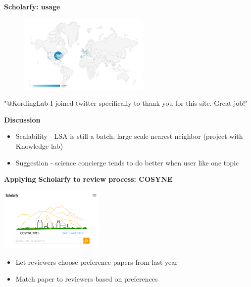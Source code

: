 \begin{frame}{\textbf{Scholarfy: usage}}

\begin{figure}
\includegraphics[width=2.5in]{images/scholarfy_map}\\
\end{figure}

\begin{center}
"@KordingLab I joined twitter specifically to thank you for this site. Great job!"
\end{center}

\end{frame}


\begin{frame}{\textbf{Discussion}}

\begin{itemize}
\item Scalability - LSA is still a batch, large scale nearest neighbor (project with Knowledge lab)
\item Suggestion - science concierge tends to do better when user like one topic
\end{itemize}

\end{frame}


\begin{frame}{\textbf{Applying Scholarfy to review process: COSYNE}}

\begin{center}
\href{http://cosyne.scienceofscience.org/}{\includegraphics[width=2.0in]{images/cosyne}}
\end{center}

\begin{itemize}
\item Let reviewers choose preference papers from last year
\item Match paper to reviewers based on preferences
\end{itemize}

\end{frame}



